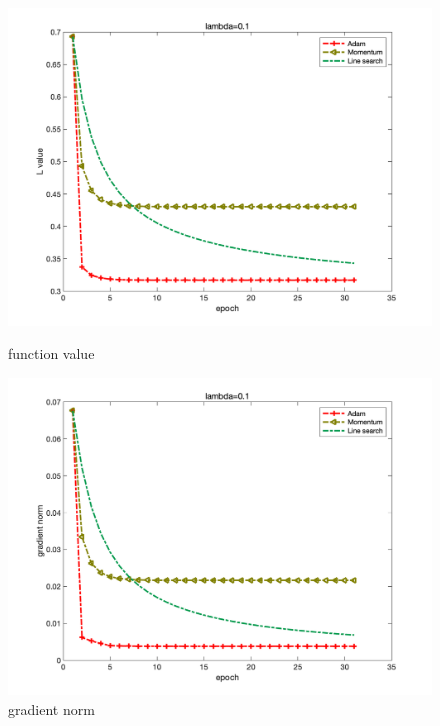 \documentclass{article}
\begin{document}
\begin{figure}[H]
	\begin{minipage}{0.33\linewidth}
		\centering
		\includegraphics[width=1\linewidth]{./fig/fval_m3}
		\caption{function value}
	\end{minipage}
	\begin{minipage}{0.33\linewidth}
		\centering
		\includegraphics[width=1\linewidth]{./fig/gnorm_m3}
		\caption{gradient norm}
	\end{minipage}
	\begin{minipage}{0.33\linewidth}
		\centering

\end{minipage}
\end{figure}
\end{document}
